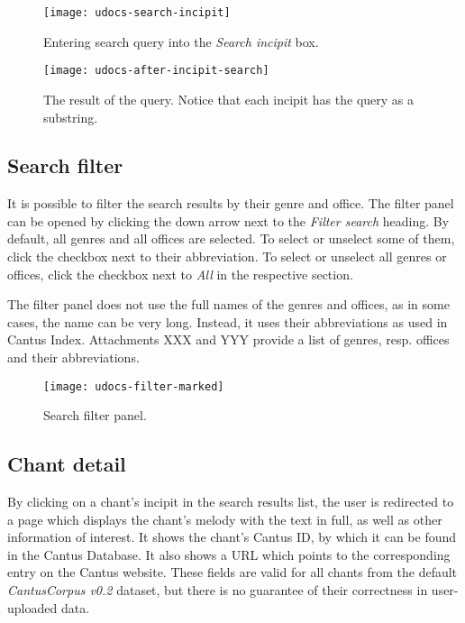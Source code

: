 \begin{figure}[!h]
\centering
\texttt{[image: udocs-search-incipit]}
\caption{Entering search query into the \emph{Search incipit} box.}
\label{fig:inc-search}
\end{figure}

\begin{figure}[!h]
\centering
\texttt{[image: udocs-after-incipit-search]}
\caption{The result of the query. Notice that each incipit has the query as a substring.}
\label{fig:inc-search-result}
\end{figure}

\subsection{Search filter}

It is possible to filter the search results by their genre and office. The filter panel can be opened by clicking the down arrow next to the \emph{Filter search}
heading. By default, all genres and all offices are selected. To select or unselect some of them, click the checkbox next to their abbreviation. To select 
or unselect all genres or offices, click the checkbox next to \emph{All} in the respective section.

The filter panel does not use the full names of the genres and offices, as in some cases, the name can be very long. Instead, it uses their abbreviations as used 
in Cantus Index. Attachments XXX and YYY provide a list of genres, resp. offices and their abbreviations.

\begin{figure}[!h]
\centering
\texttt{[image: udocs-filter-marked]}
\caption{Search filter panel.}
\label{fig:search_filter}
\end{figure}

\subsection{Chant detail}

By clicking on a chant's incipit in the search results list, the user is redirected to a page which displays the chant's melody with the text in full,
as well as other information of interest. It shows the chant's Cantus ID, by which it can be found in the Cantus Database. It also shows a URL which
points to the corresponding entry on the Cantus website. These fields are valid for all chants from the default \emph{CantusCorpus v0.2} dataset,
but there is no guarantee of their correctness in user-uploaded data.

